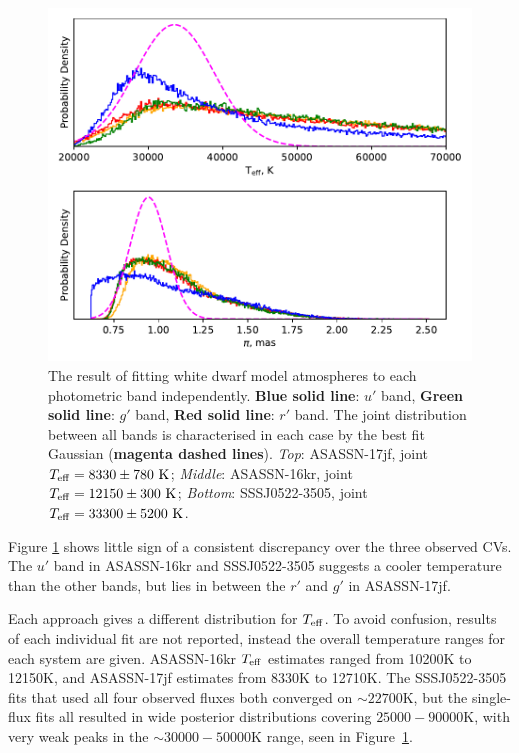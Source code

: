 \begin{figure}
    \includegraphics[width=\columnwidth, trim={0cm 6.5cm 0cm 0cm}, clip]{figures/results/three_cvs_with_weird_colours/SSS111126/PhysicalParams/all_gamma_SSS111126.pdf}
    \caption{The result of fitting white dwarf model atmospheres to each photometric band independently. {\bf Blue solid line}: $u'$ band, {\bf Green solid line}: $g'$ band, {\bf Red solid line}: $r'$ band. The joint distribution between all bands is characterised in each case by the best fit Gaussian ({\bf magenta dashed lines}). \textit{Top}: ASASSN-17jf, joint $T_{\rm eff}=8330\pm780\rm\ K$; \textit{Middle}: ASASSN-16kr, joint $T_{\rm eff}=12150\pm300\rm\ K$; \textit{Bottom}: SSSJ0522-3505, joint $T_{\rm eff}=33300\pm5200 \rm\ K$. }
    \label{fig:three white dwarfs:gamma fits}
\end{figure}

Figure \ref{fig:three white dwarfs:gamma fits} shows little sign of a consistent discrepancy over the three observed CVs. The $u'$ band in ASASSN-16kr and SSSJ0522-3505 suggests a cooler temperature than the other bands, but lies in between the $r'$ and $g'$ in ASASSN-17jf.



Each approach gives a different distribution for $T_{\rm eff}$.
To avoid confusion, results of each individual fit are not reported, instead the overall temperature ranges for each system are given.
ASASSN-16kr $T_{\rm eff}$ estimates ranged from 10200K to 12150K, and ASASSN-17jf estimates from 8330K to 12710K.
The SSSJ0522-3505 fits that used all four observed fluxes both converged on $\sim22700$K, but the single-flux fits all resulted in wide posterior distributions covering $25000 - 90000$K, with very weak peaks in the $\sim30000 - 50000$K range, seen in Figure~\ref{fig:three white dwarfs:gamma fits}.

